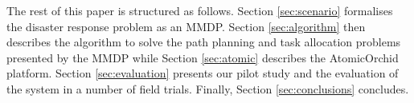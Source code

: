 The rest of this paper is structured as follows. Section \ref{sec:scenario} formalises the disaster response problem as an MMDP. Section \ref{sec:algorithm} then describes the algorithm to solve the path planning and task allocation problems presented by the MMDP while Section \ref{sec:atomic} describes the AtomicOrchid platform. Section \ref{sec:evaluation} presents our pilot study and the evaluation of the system in a number of field trials.  Finally, Section \ref{sec:conclusions} concludes.